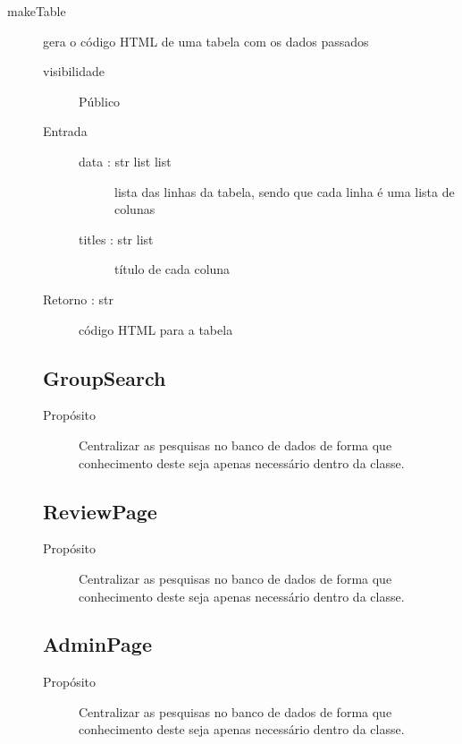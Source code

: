 \documentclass[a4paper]{article}
\begin{document}
\begin{description}
			\item [makeTable] gera o código HTML de uma tabela com os dados passados
			\begin{description} %
				\item [visibilidade] Público
				\item [Entrada] \mbox{}
				\begin{description} %
				 \item [data : str list list] lista das linhas da tabela, sendo que cada linha é uma lista de colunas
				 \item [titles : str list] título de cada coluna
				\end{description} %
				\item [Retorno : str] código HTML para a tabela
			\end{description} %
		
	
	\subsection{GroupSearch}
	
	\begin{description}
		\item [Propósito] Centralizar as pesquisas no banco de dados de forma que conhecimento deste seja apenas necessário dentro da classe.
	\end{description}
	
	\subsection{ReviewPage}
	
	\begin{description}
		\item [Propósito] Centralizar as pesquisas no banco de dados de forma que conhecimento deste seja apenas necessário dentro da classe.
	\end{description}
	
	\subsection{AdminPage}
	
	\begin{description}
		\item [Propósito] Centralizar as pesquisas no banco de dados de forma que conhecimento deste seja apenas necessário dentro da classe.
	\end{description}
	

\end{description}
\end{document}
